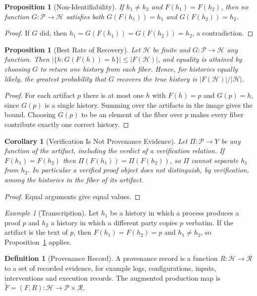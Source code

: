 \documentclass[11pt,letterpaper]{report}
\theoremstyle{plain}
\newtheorem{proposition}[theorem]{Proposition}
\newtheorem{corollary}[theorem]{Corollary}
\theoremstyle{definition}
\newtheorem{definition}[theorem]{Definition}
\theoremstyle{remark}
\newtheorem{example}[theorem]{Example}
\begin{document}
\begin{proposition}[Non-Identifiability]\label{pr:nonident}
If $h_1\ne h_2$ and $F(h_1)=F(h_2)$, then no function $G:\mathcal P\to\mathcal H$ satisfies both $G(F(h_1))=h_1$ and $G(F(h_2))=h_2$.
\end{proposition}
\begin{proof}
If $G$ did, then $h_1=G(F(h_1))=G(F(h_2))=h_2$, a contradiction.
\end{proof}

\begin{proposition}[Best Rate of Recovery]\label{pr:rate}
Let $\mathcal H$ be finite and $G:\mathcal P\to\mathcal H$ any function. Then $|\{h:G(F(h))=h\}|\le|F(\mathcal H)|$, and equality is attained by choosing $G$ to return one history from each fiber. Hence, for histories equally likely, the greatest probability that $G$ recovers the true history is $|F(\mathcal H)|/|\mathcal H|$.
\end{proposition}
\begin{proof}
For each artifact $p$ there is at most one $h$ with $F(h)=p$ and $G(p)=h$, since $G(p)$ is a single history. Summing over the artifacts in the image gives the bound. Choosing $G(p)$ to be an element of the fiber over $p$ makes every fiber contribute exactly one correct history.
\end{proof}

\begin{corollary}[Verification Is Not Provenance Evidence]\label{co:verifprov}
Let $\Pi:\mathcal P\to Y$ be any function of the artifact, including the verdict of a verification relation. If $F(h_1)=F(h_2)$ then $\Pi(F(h_1))=\Pi(F(h_2))$, so $\Pi$ cannot separate $h_1$ from $h_2$. In particular a verified proof object does not distinguish, by verification, among the histories in the fiber of its artifact.
\end{corollary}
\begin{proof}
Equal arguments give equal values.
\end{proof}

\begin{example}[Transcription]
Let $h_1$ be a history in which a process produces a proof $p$ and $h_2$ a history in which a different party copies $p$ verbatim. If the artifact is the text of $p$, then $F(h_1)=F(h_2)=p$ and $h_1\ne h_2$, so Proposition~\ref{pr:nonident} applies.
\end{example}

\begin{definition}[Provenance Record]\label{def:provrec}
A provenance record is a function $R:\mathcal H\to\mathcal R$ to a set of recorded evidence, for example logs, configurations, inputs, interventions and execution records. The augmented production map is $\widetilde F=(F,R):\mathcal H\to\mathcal P\times\mathcal R$.
\end{definition}
\end{document}
